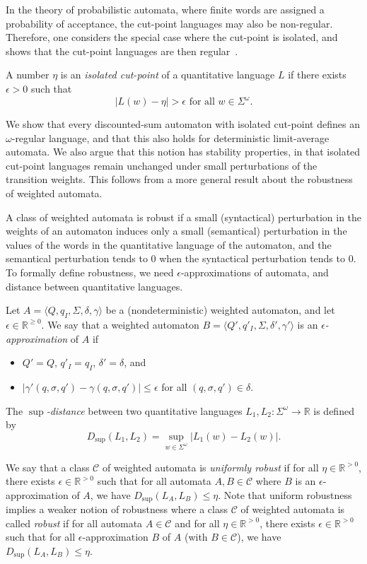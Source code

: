 \documentclass{llncs}
\def\abs#1{\ensuremath{\lvert #1\rvert}}
\newcommand{\posreal}{{\mathbb R}^{\geq 0}}
\newcommand{\sposreal}{{\mathbb R}^{> 0}}
\newcommand{\real}{{\mathbb R}}
\newcommand{\tuple}[1]{\langle #1 \rangle}
\newcommand{\C}{\mathcal{C}}
\newcommand{\weight}{\gamma}
\begin{document}
In the theory of probabilistic automata, where finite words are assigned a probability
of acceptance, the cut-point languages may also be non-regular. Therefore, 
one considers the special case where the cut-point is isolated, and
shows that the cut-point languages are then regular~\cite{Rabin63}.

A number $\eta$ is an \emph{isolated cut-point} of a quantitative language $L$
if there exists $\epsilon > 0$ such that
$$\abs{L(w) - \eta} > \epsilon \text{ for all } w \in \Sigma^{\omega}.$$

We show that every discounted-sum automaton with isolated cut-point defines
an $\omega$-regular language, and that this also holds for deterministic limit-average
automata. We also argue that this notion has stability properties, in that 
isolated cut-point languages remain unchanged under small perturbations of 
the transition weights. This follows from a more general result about
the robustness of weighted automata.

A class of weighted automata is robust if a small (syntactical) perturbation
in the weights of an automaton induces only a small (semantical) perturbation 
in the values of the words in the quantitative language of the automaton,
and the semantical perturbation tends to $0$ when the syntactical perturbation tends to $0$.
To formally define robustness, we need $\epsilon$-approximations of automata,
and distance between quantitative languages.

Let $A=\tuple{Q,q_I,\Sigma,\delta,\weight}$ be a (nondeterministic) weighted automaton,
and let $\epsilon \in \posreal$. We say that a weighted automaton $B=\tuple{Q',q'_I,\Sigma,\delta',\weight'}$
is an \emph{$\epsilon$-approximation} of $A$ if
\begin{itemize}
\item $Q' = Q$, $q'_I = q_I$, $\delta' = \delta$, and
\item $\abs{\weight'(q,\sigma,q') - \weight(q,\sigma,q')} \leq \epsilon$ for all $(q,\sigma,q') \in \delta$.
\end{itemize}
The \emph{$\sup$-distance} between two quantitative languages $L_1,L_2: \Sigma^{\omega} \to \real$
is defined by 
$$D_{\sup}(L_1,L_2) = \sup_{w \in \Sigma^{\omega}} \abs{L_1(w) - L_2(w)}.$$

We say that a class $\C$ of weighted automata is \emph{uniformly robust} if for all $\eta \in \sposreal$,
there exists $\epsilon \in \sposreal$ such that for all automata $A,B \in \C$ where 
$B$ is an $\epsilon$-approximation of $A$, we have $D_{\sup}(L_A,L_B) \leq \eta$.
Note that uniform robustness implies a weaker notion of robustness where
a class $\C$ of weighted automata is called \emph{robust} if for all automata $A \in \C$
and for all $\eta \in \sposreal$, there exists $\epsilon \in \sposreal$ such that 
for all $\epsilon$-approximation $B$ of $A$ (with $B \in \C$), we have $D_{\sup}(L_A,L_B) \leq \eta$.
\end{document}
